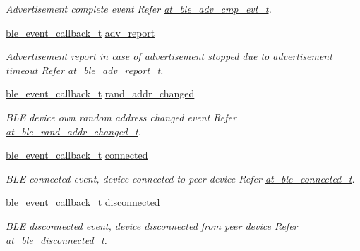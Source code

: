 \begin{DoxyCompactItemize}
\begin{DoxyCompactList}\small\item\em Advertisement complete event Refer \mbox{\hyperlink{structat__ble__adv__cmp__evt__t}{at\+\_\+ble\+\_\+adv\+\_\+cmp\+\_\+evt\+\_\+t}}. \end{DoxyCompactList}\item 
\mbox{\hyperlink{ble__manager_8h_a04ce4bb8cb8282f2762e3924b1773cc9}{ble\+\_\+event\+\_\+callback\+\_\+t}} \mbox{\hyperlink{structble__gap__event__cb_a7a194f2870758c8e7d196cd6cf5856be}{adv\+\_\+report}}
\begin{DoxyCompactList}\small\item\em Advertisement report in case of advertisement stopped due to advertisement timeout Refer \mbox{\hyperlink{structat__ble__adv__report__t}{at\+\_\+ble\+\_\+adv\+\_\+report\+\_\+t}}. \end{DoxyCompactList}\item 
\mbox{\hyperlink{ble__manager_8h_a04ce4bb8cb8282f2762e3924b1773cc9}{ble\+\_\+event\+\_\+callback\+\_\+t}} \mbox{\hyperlink{structble__gap__event__cb_a85b2130f83424798ff217b85989c4274}{rand\+\_\+addr\+\_\+changed}}
\begin{DoxyCompactList}\small\item\em B\+LE device own random address changed event Refer \mbox{\hyperlink{at__ble__api_8h_a774212504efdbcbb607153f99dd71a80}{at\+\_\+ble\+\_\+rand\+\_\+addr\+\_\+changed\+\_\+t}}. \end{DoxyCompactList}\item 
\mbox{\hyperlink{ble__manager_8h_a04ce4bb8cb8282f2762e3924b1773cc9}{ble\+\_\+event\+\_\+callback\+\_\+t}} \mbox{\hyperlink{structble__gap__event__cb_a3b38460284d2f0d8f1ae91fdd676c70e}{connected}}
\begin{DoxyCompactList}\small\item\em B\+LE connected event, device connected to peer device Refer \mbox{\hyperlink{structat__ble__connected__t}{at\+\_\+ble\+\_\+connected\+\_\+t}}. \end{DoxyCompactList}\item 
\mbox{\hyperlink{ble__manager_8h_a04ce4bb8cb8282f2762e3924b1773cc9}{ble\+\_\+event\+\_\+callback\+\_\+t}} \mbox{\hyperlink{structble__gap__event__cb_a62038f6df191ce8ba93813d8b1c304a9}{disconnected}}
\begin{DoxyCompactList}\small\item\em B\+LE disconnected event, device disconnected from peer device Refer \mbox{\hyperlink{structat__ble__disconnected__t}{at\+\_\+ble\+\_\+disconnected\+\_\+t}}. \end{DoxyCompactList}\item 

\end{DoxyCompactItemize}
